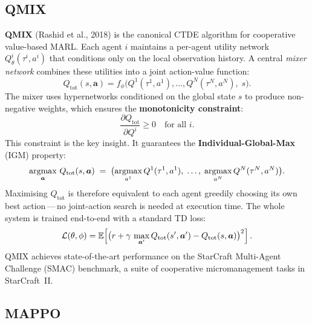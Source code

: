 \subsection{QMIX}

\textbf{QMIX} (Rashid et al., 2018) is the
canonical CTDE algorithm for cooperative value-based MARL. Each
agent $i$ maintains a per-agent utility network
$Q^i_\theta(\tau^i, a^i)$ that conditions only on the local
observation history. A central \emph{mixer network} combines these
utilities into a joint action-value function:
\begin{equation}
\label{eq:qmix}
Q_\mathrm{tot}(s, \bm{a}) = f_\phi\!\bigl(Q^1(\tau^1, a^1), \ldots,
  Q^N(\tau^N, a^N),\; s\bigr).
\end{equation}
The mixer uses hypernetworks conditioned on the
global state $s$ to produce non-negative weights, which ensures
the \textbf{monotonicity constraint}:
\[
  \frac{\partial Q_\mathrm{tot}}{\partial Q^i} \geq 0
  \quad \text{for all } i.
\]
This constraint is the key insight. It guarantees the
\textbf{Individual-Global-Max} (IGM) property:
\[
  \operatorname*{argmax}_{\bm{a}}\, Q_\mathrm{tot}(s, \bm{a})
  \;=\; \bigl(\operatorname*{argmax}_{a^1} Q^1(\tau^1, a^1),\; \ldots,\;
               \operatorname*{argmax}_{a^N} Q^N(\tau^N, a^N)\bigr).
\]
Maximising $Q_\mathrm{tot}$ is therefore equivalent to each agent
greedily choosing its own best action\,---\,no joint-action search
is needed at execution time. The whole system is trained end-to-end
with a standard TD loss:
\begin{equation}
\label{eq:qmix-loss}
\mathcal{L}(\theta, \phi) = \operatorname{\mathbb{E}}\!\left[
  \bigl(r + \gamma\, \max_{\bm{a}'} Q_\mathrm{tot}(s', \bm{a}')
  - Q_\mathrm{tot}(s, \bm{a})\bigr)^2
\right].
\end{equation}
QMIX achieves state-of-the-art performance on the StarCraft
Multi-Agent Challenge (SMAC) benchmark, a suite of
cooperative micromanagement tasks in StarCraft~II.

\subsection{MAPPO}

